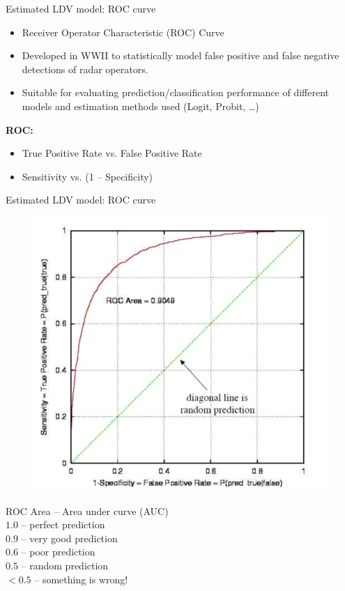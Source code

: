 \documentclass[usenames,dvipsnames]{beamer}
\begin{document}
\begin{frame}{Estimated LDV model: ROC curve}
\begin{itemize}
\item Receiver Operator Characteristic (ROC) Curve
\item Developed in WWII to statistically model false positive and false negative detections of radar operators.
\item Suitable for evaluating prediction/classification performance of different models and estimation methods used (Logit, Probit, \dots)
\end{itemize} 
\vspace*{0.5cm}
\quad \textbf{ROC:}\\
\begin{itemize}
\item True Positive Rate vs. False Positive Rate
\item Sensitivity vs. (1 – Specificity)
\end{itemize}
\end{frame}
\begin{frame}{Estimated LDV model: ROC curve}
\begin{minipage}[c]{.42\textwidth}
\begin{figure}
\centering
\includegraphics[width=1.25\textwidth]{./img/P11_4}
\end{figure}
\end{minipage}%
\hspace*{8.2mm}
\begin{minipage}[c]{.58\textwidth}
ROC Area – Area under curve (AUC) \\
$1.0$ – perfect prediction \\
$0.9$ – very good prediction \\
$0.6$ – poor prediction \\
$0.5$ – random prediction \\
$< 0.5$ – something is wrong!
\end{minipage}
\end{frame}
\end{document}
